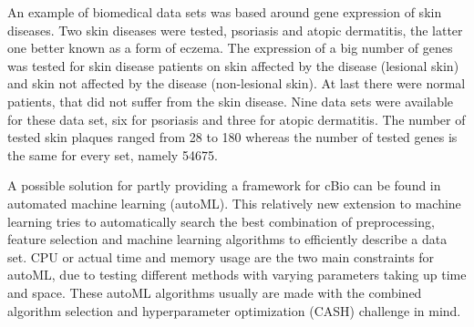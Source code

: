\documentclass[10pt,a4paper]{article}
\begin{document}
	An example of biomedical data sets was based around gene expression of skin diseases. Two skin diseases were tested, psoriasis and atopic dermatitis, the latter one better known as a form of eczema. The expression of a big number of genes was tested for skin disease patients on skin affected by the disease (lesional skin) and skin not affected by the disease (non-lesional skin). At last there were normal patients, that did not suffer from the skin disease. Nine data sets were available for these data set, six for psoriasis and three for atopic dermatitis. The number of tested skin plaques ranged from 28 to 180 whereas the number of tested genes is the same for every set, namely 54675.
	
	
	A possible solution for partly providing a framework for cBio can be found in automated machine learning (autoML). This relatively new extension to machine learning tries to automatically search the best combination of preprocessing, feature selection and machine learning algorithms to efficiently describe a data set. CPU or actual time and memory usage are the two main constraints for autoML, due to testing different methods with varying parameters taking up time and space. These autoML algorithms usually are made with the combined algorithm selection and hyperparameter optimization (CASH) challenge in mind. \cite{feurer2015efficient} 
	
\end{document}
